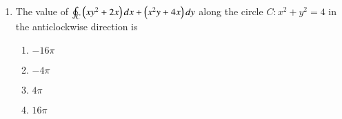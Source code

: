 \documentclass[journal]{IEEEtran}
\begin{document}
\begin{enumerate}
    \item The value of $\oint_{C} \left(xy^2 + 2x\right)dx + \left(x^2y + 4x\right)dy$ along the circle $C: x^2 + y^2=4$ in the anticlockwise direction is
        \begin{enumerate}
            \item $-16 \pi$
            \item $-4 \pi$
            \item $4 \pi$
            \item $16 \pi$
        \end{enumerate}
\end{enumerate}




  
\end{document}
